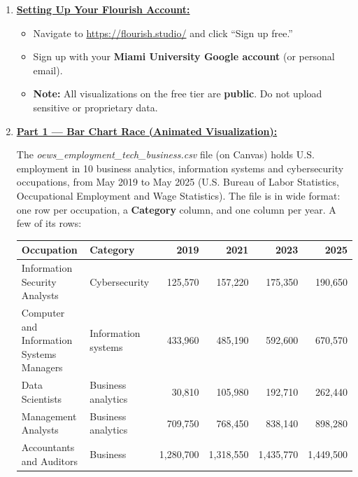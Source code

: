 \documentclass[letterpaper,addpoints, 11pt]{exam}
\begin{document}
\begin{questions}
\begin{enumerate}[label=(\Alph*)]
	\item \underline{\textbf{Setting Up Your Flourish Account:}}
	\begin{itemize}[nosep]
		\item Navigate to \url{https://flourish.studio/} and click ``Sign up free.''
		\item Sign up with your \textbf{Miami University Google account} (or personal email).
		\item \textbf{Note:} All visualizations on the free tier are \textbf{public}. Do not upload sensitive or proprietary data.
	\end{itemize}

	\bigskip
	\item \underline{\textbf{Part 1 --- Bar Chart Race (Animated Visualization):}}

	The \textit{oews\_employment\_tech\_business.csv} file (on Canvas) holds U.S. employment in 10 business analytics, information systems and cybersecurity occupations, from May 2019 to May 2025 (U.S. Bureau of Labor Statistics, Occupational Employment and Wage Statistics). The file is in wide format: one row per occupation, a \textbf{Category} column, and one column per year. A few of its rows:

	\medskip
	\begin{center}
	\small
	\begin{tabular}{l l r r r r}
		\hline
		\textbf{Occupation} & \textbf{Category} & \textbf{2019} & \textbf{2021} & \textbf{2023} & \textbf{2025} \\
		\hline
		Information Security Analysts & Cybersecurity & 125,570 & 157,220 & 175,350 & 190,650 \\
		Computer and Information Systems Managers & Information systems & 433,960 & 485,190 & 592,600 & 670,570 \\
		Data Scientists & Business analytics & 30,810 & 105,980 & 192,710 & 262,440 \\
		Management Analysts & Business analytics & 709,750 & 768,450 & 838,140 & 898,280 \\
		Accountants and Auditors & Business & 1,280,700 & 1,318,550 & 1,435,770 & 1,449,500 \\
		\hline
	\end{tabular}
	\end{center}
	\medskip


\end{enumerate}
\end{questions}
\end{document}
